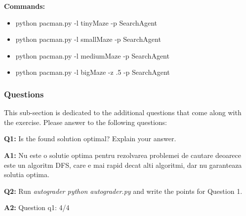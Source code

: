 \textbf{Commands:}
\begin{itemize}
    \setlength\itemsep{0em}
    \item python pacman.py -l tinyMaze -p SearchAgent
    \item python pacman.py -l smallMaze -p SearchAgent
    \item python pacman.py -l mediumMaze -p SearchAgent
    \item python pacman.py -l bigMaze -z .5 -p SearchAgent
        
\end{itemize}

\subsubsection{Questions}
This sub-section is dedicated to the additional questions that come along with the exercise. Please answer to the following questions:\newline


\textbf{Q1:} Is the found solution optimal? Explain your answer.


\textbf{A1:} Nu este o solutie optima pentru rezolvarea problemei de cautare deoarece este un algoritm DFS, care e mai rapid decat alti algoritmi, dar nu garanteaza solutia optima. %


\textbf{Q2:} Run\textit{ autograder python autograder.py} and write the points for Question 1.


\textbf{A2:} Question q1: 4/4 




